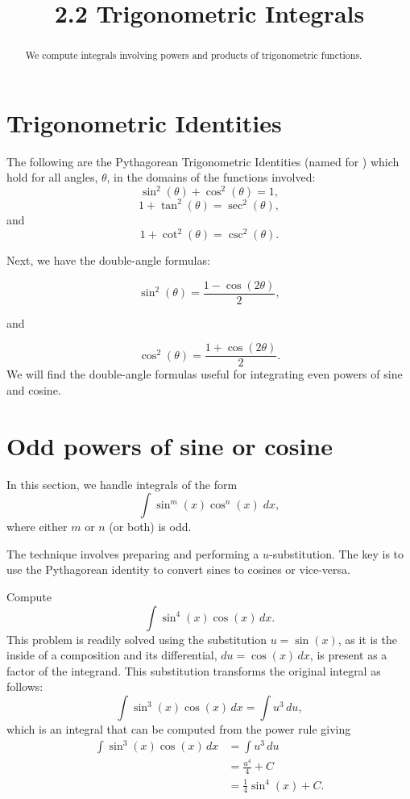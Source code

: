 \documentclass{ximera}
\title{2.2 Trigonometric Integrals}
\begin{document}
\begin{abstract}
We compute integrals involving powers and products of trigonometric functions.
\end{abstract}

\maketitle

\section{Trigonometric Identities}

The following are the Pythagorean Trigonometric Identities (named for ) which hold for all angles,
$\theta$, in the domains of the functions involved:
\[
\sin^2(\theta) + \cos^2(\theta) = 1,
\]
\[
1 + \tan^2(\theta) = \sec^2(\theta),
\]
and
\[
1 + \cot^2(\theta) = \csc^2(\theta).
\]

Next, we have the double-angle formulas:

\[
\sin^2(\theta) = \frac{1-\cos(2\theta)}{2},
\]

and

\[
\cos^2(\theta) = \frac{1+\cos(2\theta)}{2}.
\]
We will find the double-angle formulas useful for integrating even powers of sine and cosine.

\section{Odd powers of sine or cosine}

In this section, we handle integrals of the form
\[
\int \sin^m(x) \cos^n(x) \; dx,
\]
where either $m$ or $n$ (or both) is odd.

The technique involves preparing and performing a $u$-substitution. The key is to use the Pythagorean identity to convert
sines to cosines or vice-versa.

\begin{example}[example 1]
Compute
\[
\int \sin^4(x) \cos(x) \, dx.
\]
This problem is readily solved using the substitution $u = \sin(x)$, as it is the inside of a composition
and its differential, $du = \cos(x) \, dx$, is present as a factor of the integrand. 
This substitution transforms the original integral as follows:
\[
\int \sin^3(x) \cos(x) \, dx = \int u^3 \, du,
\]
which is an integral that can be computed from the power rule giving
\begin{align*}
\int \sin^3(x) \cos(x) \, dx &= \int u^3 \, du\\
                             &= \frac{u^4}{4} + C\\
                             &= \frac14 \sin^4(x) + C.
\end{align*}

\end{example}
\end{document}

